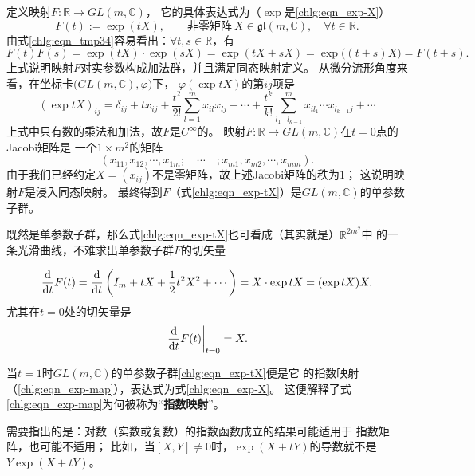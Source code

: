 定义映射$F:\mathbb{R}\to GL(m,\mathbb{C})$，
它的具体表达式为（$\exp$是\eqref{chlg:eqn_exp-X}）
\begin{equation}\label{chlg:eqn_exp-tX}
   F(t) := \exp(t X),\qquad \text{非零矩阵}\
      X \in \mathfrak{gl}(m,\mathbb{C}),\quad \forall t\in \mathbb{R} .
\end{equation}
由式\eqref{chlg:eqn_tmp34}容易看出：$\forall t,s \in \mathbb{R}$，有
\begin{equation*}
    F(t)F(s) = \exp(t X) \cdot \exp(s X) = \exp(t X + s X)
    =\exp\bigl((t+s) X\bigr) = F(t+s) .
\end{equation*}
上式说明映射$F$对实参数构成加法群，并且满足同态映射定义。
从微分流形角度来看，在坐标卡$\bigl(GL(m,\mathbb{C}),\varphi \bigr)$下，
$\varphi(\exp tX)$的第$ij$项是
\begin{equation*}
    (\exp tX )_{ij} = \delta_{ij} + t x_{ij} + \frac{t^2}{2!} \sum_{l=1}^{m} x_{il} x_{lj}
    + \cdots + \frac{t^k}{k!} \sum_{l_1\cdots l_{k-1}}^{m} x_{il_1} \cdots x_{l_{k-1} j}
    + \cdots
\end{equation*}
上式中只有数的乘法和加法，故$F$是$C^\infty$的。
映射$F:\mathbb{R}\to GL(m,\mathbb{C})$在$t=0$点的Jacobi矩阵是
一个$1\times m^2$的矩阵
\begin{equation}
    (x_{11},x_{12},\cdots,x_{1m};\quad\cdots\quad;x_{m1},x_{m2},\cdots,x_{mm}) .
\end{equation}
由于我们已经约定$X=(x_{ij})$不是零矩阵，故上述Jacobi矩阵的秩为$1$；
这说明映射$F$是浸入同态映射。
最终得到$F$（式\eqref{chlg:eqn_exp-tX}）是$GL(m,\mathbb{C})$的单参数子群。

既然是单参数子群，那么式\eqref{chlg:eqn_exp-tX}也可看成（其实就是）$\mathbb{R}^{2m^2}$中
的一条光滑曲线，不难求出单参数子群$F$的切矢量

\begin{equation}
    \frac{\dd }{\dd t} F(t)
    = \frac{\dd }{\dd t} \left(I_m + t X
    +\frac{1}{2}t^2 X^2 +\cdots \right)
    = X \cdot \exp tX = (\exp tX) X .
\end{equation}
尤其在$t=0$处的切矢量是
\begin{equation}
    \left. \frac{\dd }{\dd t} F(t)\right|_{t=0}    = X .
\end{equation}

当$t=1$时$GL(m,\mathbb{C})$的单参数子群\eqref{chlg:eqn_exp-tX}便是它
的{指数映射}（\eqref{chlg:eqn_exp-map}），表达式为式\eqref{chlg:eqn_exp-X}。
这便解释了式\eqref{chlg:eqn_exp-map}为何被称为“\textbf{指数映射}”。

需要指出的是：对数（实数或复数）的指数函数成立的结果可能适用于
指数矩阵，也可能不适用；
比如，当$[X,Y]\neq 0$时，$\exp(X+tY)$的导数就不是$Y\exp(X+tY)$。

